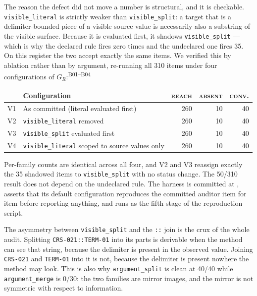 \documentclass[11pt]{article}
\newcommand{\ledger}[1]{\textsuperscript{\textsf{\scriptsize #1}}}
\newcommand{\artifact}[1]{\path{#1}}
\newcommand{\st}[1]{\textsc{\small #1}}
\newcommand{\dfam}[1]{\texttt{#1}}
\begin{document}
The reason the defect did not move a number is structural, and it is
checkable. \texttt{visible\_literal} is strictly weaker than
\texttt{visible\_split}: a target that is a delimiter-bounded piece of a
visible source value is necessarily also a substring of the visible surface.
Because it is evaluated first, it shadows \texttt{visible\_split} --- which is
why the declared rule fires zero times and the undeclared one fires 35. On this
register the two accept exactly the same items. We verified this by ablation
rather than by argument, re-running all 310 items under four configurations of
$G_R$:\ledger{B01--B04}

\begin{center}
\small
\begin{tabular}{@{}llrrr@{}}
\toprule
& Configuration & \st{reach} & \st{absent} & \st{conv.} \\
\midrule
V1 & As committed (literal evaluated first) & 260 & 10 & 40 \\
V2 & \texttt{visible\_literal} removed & 260 & 10 & 40 \\
V3 & \texttt{visible\_split} evaluated first & 260 & 10 & 40 \\
V4 & \texttt{visible\_literal} scoped to source values only & 260 & 10 & 40 \\
\bottomrule
\end{tabular}
\end{center}

\medskip
Per-family counts are identical across all four, and V2 and V3 reassign exactly
the 35 shadowed items to \texttt{visible\_split} with no status change. The
50/310 result does not depend on the undeclared rule. The harness is committed
at \artifact{research/gate19/ablation.py}, asserts that its default
configuration reproduces the committed auditor item for item before reporting
anything, and runs as the fifth stage of the reproduction script.

The asymmetry between \texttt{visible\_split} and the \texttt{::} join is the
crux of the whole audit. Splitting \texttt{CRS-021::TERM-01} into its parts is
derivable when the method can see that string, because the delimiter is
present in the observed value. Joining \texttt{CRS-021} and \texttt{TERM-01}
into it is not, because the delimiter is present nowhere the method may look.
This is also why \dfam{argument\_split} is clean at 40/40 while
\dfam{argument\_merge} is 0/30: the two families are mirror images, and the
mirror is not symmetric with respect to information.
\end{document}
